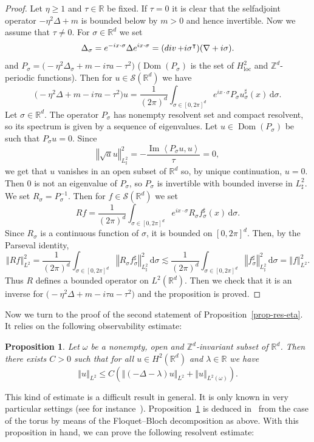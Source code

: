 \documentclass[11pt]{article}
\newtheorem{prop}[theo]{Proposition}
\theoremstyle{definition}
\numberwithin{equation}{section}
\numberwithin{figure}{section}
\numberwithin{table}{section}
\newcommand{\nr}[1]{\left\Vert #1\right\Vert}
\newcommand{\innp}[2]{\left< #1, #2 \right>}
\renewcommand{\leq}{\leqslant}
\renewcommand{\geq}{\geqslant}
\newcommand{\inv}{^{-1}}
\newcommand{\1}{\mathds 1}
\newcommand{\trsp}{^{\intercal}}
\newcommand{\divg}{\mathop{\rm{div}}\nolimits}
\DeclareMathOperator{\Imop}{Im}
\DeclareMathOperator{\Dom}{Dom}
\renewcommand{\Im}{\Imop}
\newcommand{\loc}{{\mathrm{loc}}}
\newcommand{\R}{\mathbb{R}}
\newcommand{\D}{\Delta}
\renewcommand{\l}{\lambda}
\newcommand{\s}{\sigma}
\renewcommand{\t}{\tau}
\renewcommand{\o}{\omega}
\newcommand{\Sc}{{\mathcal S}}
\newcommand{\dd}{\mathrm{d}}
\newcommand{\dsigma}{\dd \sigma}
\begin{document}
\begin{proof}
Let $\eta \geq 1$ and $\t \in \R$ be fixed. If $\t = 0$ it is clear that the selfadjoint operator $-\eta^2 \D + m$ is bounded below by $m > 0$ and hence invertible. Now we assume that $\t \neq 0$. For $\s \in \R^d$ we set
\[
\D_\s = e^{-ix\cdot \s} \D e^{ix\cdot \s} = (\divg + i \s\trsp) (\nabla + i\s).
\]
and $P_\s = \big(-\eta^2 \D_\s + m - i\t a - \t^2 \big)$ ($\Dom(P_\s)$ is the set of $H^2_\loc$ and $\mathbb Z^d$-periodic functions). Then for $u \in \Sc(\R^d)$ we have
\[
\big(-\eta^2 \D + m - i\t a - \t^2 \big) u = \frac 1 {(2\pi)^d} \int_{\s \in [0,2\pi]^d} e^{ix\cdot \s} P_\s u^\sharp_\s(x) \, \dsigma.
\]
Let $\s \in \R^d$. The operator $P_\s$ has nonempty resolvent set and compact resolvent, so its spectrum is given by a sequence of eigenvalues. Let $u \in \Dom(P_\s)$ be such that $P_\s u = 0$. Since
\[
\nr{\sqrt a u}_{L^2_\sharp}^2 = - \frac {\Im \innp{P_\s u}{u}} \t = 0,
\]
we get that $u$ vanishes in an open subset of $\R^d$ so, by unique continuation, $u = 0$. Then 0 is not an eigenvalue of $P_\s$, so $P_\s$ is invertible with bounded inverse in $L^2_\sharp$. We set $R_\s = P_\s\inv$. Then for $f \in \Sc(\R^d)$ we set
\[
R f = \frac 1 {(2\pi)^d} \int_{\s \in [0,2\pi]^d} e^{ix\cdot \s} R_\s f^\sharp_\s(x) \, \dsigma.
\]
Since $R_\s$ is a continuous function of $\s$, it is bounded on $[0,2\pi]^d$. Then, by the Parseval identity,
\[
\nr{Rf}_{L^2}^2 = \frac 1 {(2\pi)^d} \int_{\s \in [0,2\pi]^d} \nr{R_\s f_\s^\sharp}_{L^2_\sharp}^2 \, \dsigma \lesssim \frac 1 {(2\pi)^d} \int_{\s \in [0,2\pi]^d} \nr{ f_\s^\sharp}_{L^2_\sharp}^2 \, \dsigma = \nr{f}_{L^2}^2.
\]
Thus $R$ defines a bounded operator on $L^2(\R^d)$. Then we check that it is an inverse for $\big(-\eta^2 \D + m - i\t a - \t^2 \big)$ and the proposition is proved.
\end{proof}

Now we turn to the proof of the second statement of Proposition~\ref{prop-res-eta}. It relies on the following observability estimate:

\begin{prop}\label{prop-Wun}
Let $\o$ be a nonempty, open and $\mathbb Z^d$-invariant subset of $\R^d$. Then there exists $C > 0$ such that for all $u \in H^2(\R^d)$ and $\l \in \R$ we have
\[
\nr{u}_{L^2} \leq C \left(\nr{(-\D - \l)u}_{L^2} + \nr{u}_{L^2(\o)} \right).
\]
\end{prop}

This kind of estimate is a difficult result in general. It is only known in very particular settings (see for instance~\cite{Jaffard90,BurqZwo12,AnantharamanLeMa16}). Proposition~\ref{prop-Wun} is deduced in~\cite{Wunsch} from the case of the torus by means of the Floquet--Bloch decomposition as above. With this proposition in hand, we can prove the following resolvent estimate:
\end{document}
